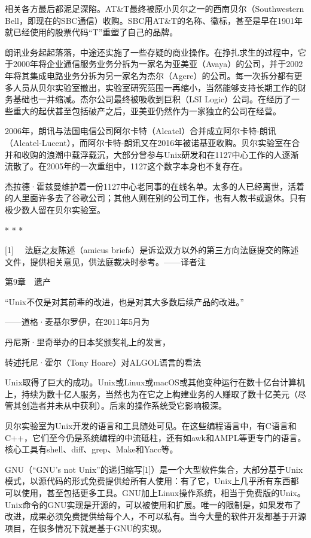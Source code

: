 \documentclass[a4paper,12pt,UTF8,twoside]{ctexbook}
\begin{document}
相关各方最后都泥足深陷。AT\&T最终被原小贝尔之一的西南贝尔（Southwestern Bell，即现在的SBC通信）收购。SBC用AT\&T的名称、徽标，甚至是早在1901年就已经使用的股票代码“T”重塑了自己的品牌。

朗讯业务起起落落，中途还实施了一些存疑的商业操作。在挣扎求生的过程中，它于2000年将企业通信服务业务分拆为一家名为亚美亚（Avaya）的公司，并于2002年将其集成电路业务分拆为另一家名为杰尔（Agere）的公司。每一次拆分都有更多人员从贝尔实验室撤出，实验室研究范围一再缩小，当然能够支持长期工作的财务基础也一并缩减。杰尔公司最终被吸收到巨积（LSI Logic）公司。在经历了一些重大的起伏甚至包括破产之后，亚美亚仍然作为一家独立的公司在经营。

2006年，朗讯与法国电信公司阿尔卡特（Alcatel）合并成立阿尔卡特-朗讯（Alcatel-Lucent），而阿尔卡特-朗讯又在2016年被诺基亚收购。贝尔实验室在合并和收购的浪潮中载浮载沉，大部分曾参与Unix研发和在1127中心工作的人逐渐流散了。在2005年的一次重组中，1127这个数字本身也不复存在。

杰拉德·霍兹曼维护着一份1127中心老同事的在线名单。太多的人已经离世，活着的人里面许多去了谷歌公司；其他人则在别的公司工作，也有人教书或退休。只有极少数人留在贝尔实验室。



* * *



[1]　 法庭之友陈述（amicus briefs）是诉讼双方以外的第三方向法庭提交的陈述文件，提供相关意见，供法庭裁决时参考。——译者注





第9章　遗产


“Unix不仅是对其前辈的改进，也是对其大多数后续产品的改进。”

——道格·麦基尔罗伊，在2011年5月为

丹尼斯·里奇举办的日本奖颁奖礼上的发言，

转述托尼·霍尔（Tony Hoare）对ALGOL语言的看法

Unix取得了巨大的成功。Unix或Linux或macOS或其他变种运行在数十亿台计算机上，持续为数十亿人服务，当然也为在它之上构建业务的人赚取了数十亿美元（尽管其创造者并未从中获利）。后来的操作系统受它影响极深。

贝尔实验室为Unix开发的语言和工具随处可见。在这些编程语言中，有C语言和C++，它们至今仍是系统编程的中流砥柱，还有如awk和AMPL等更专门的语言。核心工具有shell、diff、grep、Make和Yacc等。

GNU（“GNU’s not Unix”的递归缩写[1]）是一个大型软件集合，大部分基于Unix模式，以源代码的形式免费提供给所有人使用：有了它，Unix上几乎所有东西都可以使用，甚至包括更多工具。GNU加上Linux操作系统，相当于免费版的Unix。Unix命令的GNU实现是开源的，可以被使用和扩展。唯一的限制是，如果发布了改进，成果必须免费提供给每个人，不可以私有。当今大量的软件开发都基于开源项目，在很多情况下就是基于GNU的实现。
\end{document}
